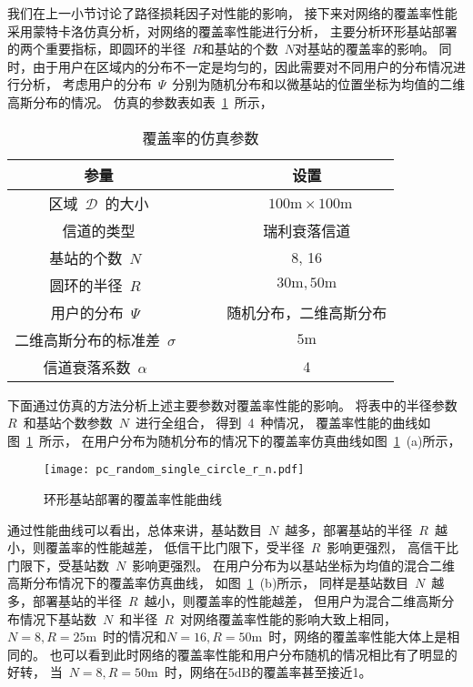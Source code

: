 我们在上一小节讨论了路径损耗因子对性能的影响，
接下来对网络的覆盖率性能采用蒙特卡洛仿真分析，对网络的覆盖率性能进行分析，
主要分析环形基站部署的两个重要指标，即圆环的半径~$R$和基站的个数~$N$对基站的覆盖率的影响。
同时，由于用户在区域内的分布不一定是均匀的，因此需要对不同用户的分布情况进行分析，
考虑用户的分布~$\Psi$~分别为随机分布和以微基站的位置坐标为均值的二维高斯分布的情况。
仿真的参数表如表~\ref{single_circle_pc_sim_para}~所示，
\begin{table}[htbp]
\caption{覆盖率的仿真参数}
\label{single_circle_pc_sim_para}
\vspace{0.5em}\centering\wuhao
\begin{tabular}{cccc}
\toprule[1.5pt]
参量 & & & 设置 \\
\midrule[0.5pt]
区域~$\mathcal{D}$~的大小  & & & ~$100\mathrm{m} \times 100 \mathrm{m}$ \\
信道的类型 & & &  瑞利衰落信道\\
基站的个数~$N$~ & & &  8, 16\\
圆环的半径~$R$~ & & &  ${30\mathrm{m}},{50\mathrm{m}}$\\
用户的分布~$\Psi$~ & & & 随机分布，二维高斯分布\\
二维高斯分布的标准差~$\sigma$~ & & & ${5\mathrm{m}}$\\
信道衰落系数~$\alpha$~  & & & 4\\
\bottomrule[1.5pt]
\end{tabular}
\end{table}
下面通过仿真的方法分析上述主要参数对覆盖率性能的影响。
将表中的半径参数~$R$~和基站个数参数~$N$~进行全组合，
得到~4~种情况，
覆盖率性能的曲线如图~\ref{pc_random_single_circle_r_n}~所示，
在用户分布为随机分布的情况下的覆盖率仿真曲线如图~\ref{pc_random_single_circle_r_n}~(a)所示，
\begin{figure}[htbp]
\centering
\texttt{[image: pc\_random\_single\_circle\_r\_n.pdf]}
\caption{环形基站部署的覆盖率性能曲线}\vspace{-0.5em}
\label{pc_random_single_circle_r_n}
\end{figure}
通过性能曲线可以看出，总体来讲，基站数目~$N$~越多，部署基站的半径~$R$~越小，则覆盖率的性能越差，
低信干比门限下，受半径~$R$~影响更强烈，
高信干比门限下，受基站数~$N$~影响更强烈。
在用户分布为以基站坐标为均值的混合二维高斯分布情况下的覆盖率仿真曲线，
如图~\ref{pc_random_single_circle_r_n}~(b)所示，
同样是基站数目~$N$~越多，部署基站的半径~$R$~越小，则覆盖率的性能越差，
但用户为混合二维高斯分布情况下基站数~$N$~和半径~$R$~对网络覆盖率性能的影响大致上相同，
$N=8,R=25\mathrm{m}$~时的情况和$N=16,R=50\mathrm{m}$~时，网络的覆盖率性能大体上是相同的。
也可以看到此时网络的覆盖率性能和用户分布随机的情况相比有了明显的好转，
当~$N=8,R=50\mathrm{m}$~时，网络在$5\mathrm{dB}$的覆盖率甚至接近1。


